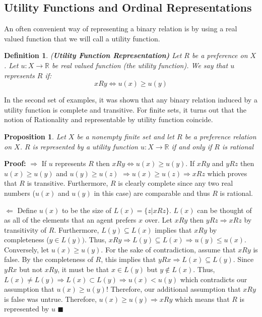 \documentclass[12pt]{article}
\newtheorem{prop}{Proposition}
\newtheorem{defin}{Definition}
\newcommand{\tn}[1]{\textnormal{#1}}
\newcommand{\name}[1]{\tn{(\textbf{#1)}}}
\newcommand{\RR}{\mathbb{R}}
\newcommand{\RIGHT}{\Longrightarrow}
\newcommand{\LEFT}{\Longleftarrow}
\newcommand{\IFF}{\Longleftrightarrow}
\newcommand{\QED}{\blacksquare}
\newcommand{\Proof}{\textbf{Proof:} \hspace*{0.25mm}}
\newcommand{\3}{\vspace*{3mm}}
\begin{document}
\subsection{Utility Functions and Ordinal Representations}

An often convenient way of representing a binary relation is by using a real valued function that we will call a utility function.

\begin{defin} \name{Utility Function Representation}
\tn{Let $R$ be a preference on $X$. Let $u : X \to \RR$ be real valued function (the utility function). We say that $u$ represents $R$ if:}
\[x R y \IFF u(x) \geq u(y)\]

\end{defin}

In the second set of examples, it was shown that any binary relation induced by a utility function is complete and transitive. For finite sets, it turns out that the notion of Rationality and representable by utility function coincide. 
\begin{prop} \tn{Let $X$ be a nonempty finite set and let $R$ be a preference relation on $X$. $R$ is represented by a utility function $u:X \to \RR$ if and only if $R$ is rational} 
\end{prop}

\Proof $\RIGHT$ If $u$ represents $R$ then $x R y \IFF u(x) \geq u(y)$. If $x R y$ and $y R z$ then $u(x) \geq u(y)$ and $u(y) \geq u(z)$ $\RIGHT u(x) \geq u(z) \RIGHT x R z$ which proves that $R$ is transitive. Furthermore, $R$ is clearly complete since any two real numbers ($u(x)$ and $u(y)$ in this case) are comparable and thus $R$ is rational. 


$\LEFT$ Define $u(x)$ to be the size of $L(x) = \{z | x R z\}$. $L(x)$ can be thought of as all of the elements that an agent prefers $x$ over. Let $x R y$ then $y R z \RIGHT x R z$ by transitivity of $R$. Furthermore, $L(y) \subseteq L(x)$ implies that $x R y$ by completeness ($y \in L(y))$. Thus, $x R y \RIGHT L(y) \subseteq L(x) \RIGHT u(y) \leq u(x) $. Conversely, let $u(x) \geq u(y)$. For the sake of contradiction, assume that $x R y$ is false. By the completeness of $R$, this implies that $y R x \RIGHT L(x) \subseteq L(y)$. Since $y R x$ but not $x R y$, it must be that $x \in L(y)$ but $y \notin L(x)$. Thus, $L(x) \neq L(y) \RIGHT L(x) \subset L(y) \RIGHT u(x) < u(y)$ which contradicts our assumption that $u(x) \geq u(y)$! Therefore, our additional assumption that $x R y$ is false was untrue. Therefore, $u(x) \geq u(y) \RIGHT x R y$ which means that $R$ is represented by $u$ $\QED$
\end{document}
